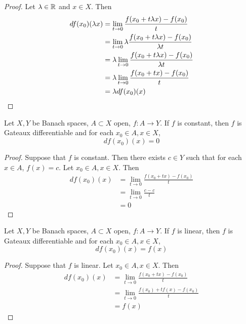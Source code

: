 \documentclass{book}
\begin{document}
	\begin{proof}
	Let $\lambda \in \mathbb{R}$ and $x \in X$. Then 
	\begin{align*}
	df(x_0)(\lambda x) 
	&= \lim_{t \rightarrow 0} \frac{f(x_0 + t \lambda x) - f(x_0)}{t} \\
	&= \lim_{t \rightarrow 0} \lambda \frac{f(x_0 + t \lambda x) - f(x_0)}{\lambda t} \\
	&= \lambda \lim_{t \rightarrow 0}  \frac{f(x_0 + t \lambda x) - f(x_0)}{\lambda t} \\
	&= \lambda \lim_{t \rightarrow 0}  \frac{f(x_0 + t x) - f(x_0)}{t} \\
	&= \lambda df(x_0)(x) 
	\end{align*}
	\end{proof}
	
	\begin{ex} 
	Let $X, Y$ be Banach spaces, $A \subset X$ open, $f:A \rightarrow Y$. If $f$ is constant, then $f$ is Gateaux differentiable and for each $x_0\in A, x \in X$, $$df(x_0)(x) = 0$$
	\end{ex}
	
	\begin{proof}
	Suppose that $f$ is constant. Then there exists $c \in Y$ such that for each $x \in A$, $f(x) = c$. Let $x_0 \in A, x \in X$. Then 
	\begin{align*}
	df(x_0)(x) 
	&= \lim_{t \rightarrow 0} \frac{f(x_0 + t x) - f(x_0)}{t} \\
	&= \lim_{t \rightarrow 0} \frac{c - c}{t} \\
	&= 0
	\end{align*}
	\end{proof}
	
	\begin{ex} 
	Let $X, Y$ be Banach spaces, $A \subset X$ open, $f:A \rightarrow Y$. If $f$ is linear, then $f$ is Gateaux differentiable and for each $x_0\in A, x \in X$, $$df(x_0)(x) = f(x)$$
	\end{ex}
	
	\begin{proof}
	Suppose that $f$ is linear. Let $x_0\in A, x \in X$. Then 
	\begin{align*}
	df(x_0)(x) 
	&= \lim_{t \rightarrow 0} \frac{f(x_0 + t x) - f(x_0)}{t} \\
	&= \lim_{t \rightarrow 0} \frac{f(x_0) + t f(x) - f(x_0)}{t} \\
	&= f(x)
	\end{align*}
	\end{proof}		
	
\end{document}
